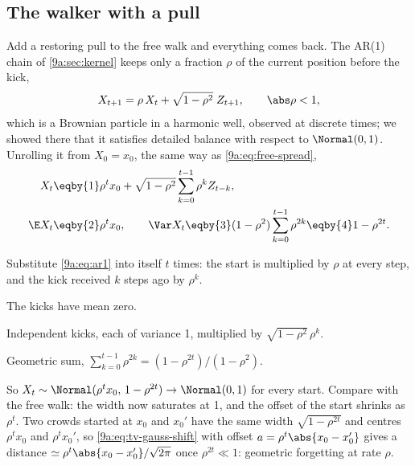\subsection{The walker with a pull}
\label{9a:sec:ar1-forgetting}

Add a restoring pull to the free walk and everything comes back. The AR(1) chain of
\cref{9a:sec:kernel} keeps only a fraction $\rho$ of the current position before the kick,
\begin{equation}
  X_{t+1}=\rho\,X_t+\sqrt{1-\rho^2}\;Z_{t+1},\qquad \abs\rho<1,
  \label{9a:eq:ar1}
\end{equation}
which is a Brownian particle in a harmonic well, observed at discrete times; we showed there that
it satisfies detailed balance with respect to $\Normal(0,1)$. Unrolling it from $X_0=x_0$, the
same way as \eqref{9a:eq:free-spread},
\begin{align}
  X_t
  &\eqby{1}\rho^t x_0+\sqrt{1-\rho^2}\sum_{k=0}^{t-1}\rho^k Z_{t-k},
  \nonumber\\
  \E X_t&\eqby{2}\rho^t x_0,
  \qquad
  \Var X_t\eqby{3}(1-\rho^2)\sum_{k=0}^{t-1}\rho^{2k}\eqby{4}1-\rho^{2t}.
  \label{9a:eq:ar1-unroll}
\end{align}
\begin{explain}
  \item Substitute \eqref{9a:eq:ar1} into itself $t$ times: the start is multiplied by $\rho$ at
        every step, and the kick received $k$ steps ago by $\rho^k$.
  \item The kicks have mean zero.
  \item Independent kicks, each of variance 1, multiplied by $\sqrt{1-\rho^2}\,\rho^k$.
  \item Geometric sum, $\sum_{k=0}^{t-1}\rho^{2k}=(1-\rho^{2t})/(1-\rho^2)$.
\end{explain}
So $X_t\sim\Normal(\rho^tx_0,\,1-\rho^{2t})\to\Normal(0,1)$ for every start. Compare with the free
walk: the width now saturates at 1, and the offset of the start shrinks as $\rho^t$. Two crowds
started at $x_0$ and $x_0'$ have the same width $\sqrt{1-\rho^{2t}}$ and centres $\rho^tx_0$ and
$\rho^tx_0'$, so \eqref{9a:eq:tv-gauss-shift} with offset $a=\rho^t\abs{x_0-x_0'}$ gives a
distance $\simeq\rho^t\abs{x_0-x_0'}/\sqrt{2\pi}$ once $\rho^{2t}\ll1$: geometric forgetting at
rate $\rho$.

